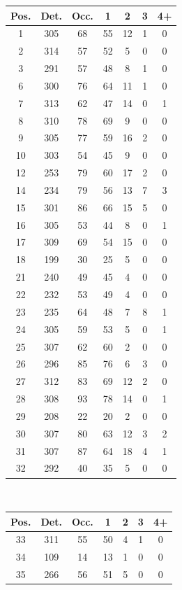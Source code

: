 \documentclass[pdftex,12pt,a4paper]{report}
\begin{document}
\begin{appendices}
\begin{table}[H]
\begin{tabular}[t]{ c | c | c | c | c | c | c }
\hline
Pos. & Det. & Occ. & 1 & 2 & 3 & 4+
\\
\hline\hline
1 & 305 & 68 & 55 & 12 & 1 & 0
\\
2 & 314 & 57 & 52 & 5 & 0 & 0
\\
3 & 291 & 57 & 48 & 8 & 1 & 0
\\
6 & 300 & 76 & 64 & 11 & 1 & 0
\\
7 & 313 & 62 & 47 & 14 & 0 & 1
\\
8 & 310 & 78 & 69 & 9 & 0 & 0
\\
9 & 305 & 77 & 59 & 16 & 2 & 0
\\
10 & 303 & 54 & 45 & 9 & 0 & 0
\\
12 & 253 & 79 & 60 & 17 & 2 & 0
\\
14 & 234 & 79 & 56 & 13 & 7 & 3
\\
15 & 301 & 86 & 66 & 15 & 5 & 0
\\
16 & 305 & 53 & 44 & 8 & 0 & 1
\\
17 & 309 & 69 & 54 & 15 & 0 & 0
\\
18 & 199 & 30 & 25 & 5 & 0 & 0
\\
21 & 240 & 49 & 45 & 4 & 0 & 0
\\
22 & 232 & 53 & 49 & 4 & 0 & 0
\\
23 & 235 & 64 & 48 & 7 & 8 & 1
\\
24 & 305 & 59 & 53 & 5 & 0 & 1
\\
25 & 307 & 62 & 60 & 2 & 0 & 0
\\
26 & 296 & 85 & 76 & 6 & 3 & 0
\\
27 & 312 & 83 & 69 & 12 & 2 & 0
\\
28 & 308 & 93 & 78 & 14 & 0 & 1
\\
29 & 208 & 22 & 20 & 2 & 0 & 0
\\
30 & 307 & 80 & 63 & 12 & 3 & 2
\\
31 & 307 & 87 & 64 & 18 & 4 & 1
\\
32 & 292 & 40 & 35 & 5 & 0 & 0
\\
\hline
\end{tabular}
~
\begin{tabular}[t]{ c | c | c | c | c | c | c }
\hline
Pos. & Det. & Occ. & 1 & 2 & 3 & 4+
\\
\hline\hline
33 & 311 & 55 & 50 & 4 & 1 & 0
\\
34 & 109 & 14 & 13 & 1 & 0 & 0
\\
35 & 266 & 56 & 51 & 5 & 0 & 0

\end{tabular}
\end{table}
\end{appendices}
\end{document}
